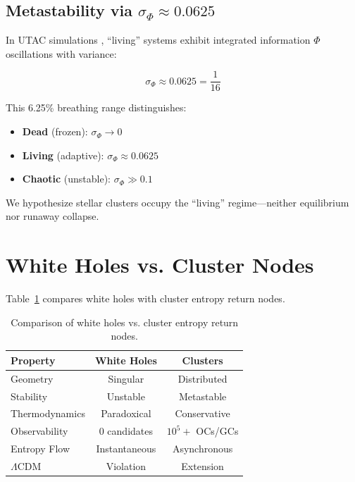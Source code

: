 \documentclass[11pt,a4paper,twocolumn]{article}
\begin{document}
\subsection{Metastability via $\sigma_\Phi \approx 0.0625$}

In UTAC simulations \citep{romer2025living}, ``living'' systems exhibit integrated information $\Phi$ oscillations with variance:

\begin{equation}
\sigma_\Phi \approx 0.0625 = \frac{1}{16}
\end{equation}

This 6.25\% breathing range distinguishes:
\begin{itemize}
    \item \textbf{Dead} (frozen): $\sigma_\Phi \to 0$
    \item \textbf{Living} (adaptive): $\sigma_\Phi \approx 0.0625$
    \item \textbf{Chaotic} (unstable): $\sigma_\Phi \gg 0.1$
\end{itemize}

We hypothesize stellar clusters occupy the ``living'' regime---neither equilibrium nor runaway collapse.

\section{White Holes vs. Cluster Nodes}

Table~\ref{tab:comparison} compares white holes with cluster entropy return nodes.

\begin{table}[h]
\centering
\small
\begin{tabular}{lcc}
\hline
\textbf{Property} & \textbf{White Holes} & \textbf{Clusters} \\
\hline
Geometry & Singular & Distributed \\
Stability & Unstable & Metastable \\
Thermodynamics & Paradoxical & Conservative \\
Observability & 0 candidates & $10^5+$ OCs/GCs \\
Entropy Flow & Instantaneous & Asynchronous \\
$\Lambda$CDM & Violation & Extension \\
\hline
\end{tabular}
\caption{Comparison of white holes vs. cluster entropy return nodes.}
\label{tab:comparison}
\end{table}
\end{document}
